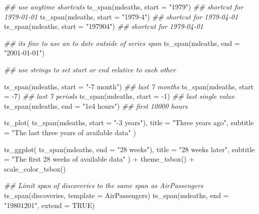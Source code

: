 \documentclass[
  letterpaper,
  DIV=11,
  numbers=noendperiod]{scrreport}
\newenvironment{Shaded}{\begin{snugshade}}{\end{snugshade}}
\newcommand{\AttributeTok}[1]{\textcolor[rgb]{0.40,0.45,0.13}{#1}}
\newcommand{\ConstantTok}[1]{\textcolor[rgb]{0.56,0.35,0.01}{#1}}
\newcommand{\DecValTok}[1]{\textcolor[rgb]{0.68,0.00,0.00}{#1}}
\newcommand{\DocumentationTok}[1]{\textcolor[rgb]{0.37,0.37,0.37}{\textit{#1}}}
\newcommand{\FunctionTok}[1]{\textcolor[rgb]{0.28,0.35,0.67}{#1}}
\newcommand{\NormalTok}[1]{\textcolor[rgb]{0.00,0.23,0.31}{#1}}
\newcommand{\SpecialCharTok}[1]{\textcolor[rgb]{0.37,0.37,0.37}{#1}}
\newcommand{\StringTok}[1]{\textcolor[rgb]{0.13,0.47,0.30}{#1}}
\begin{document}
\begin{Shaded}
\begin{Highlighting}[]
\DocumentationTok{\#\# use \textquotesingle{}anytime\textquotesingle{} shortcuts}
\FunctionTok{ts\_span}\NormalTok{(mdeaths, }\AttributeTok{start =} \StringTok{"1979"}\NormalTok{)       }\DocumentationTok{\#\# shortcut for 1979{-}01{-}01}
\FunctionTok{ts\_span}\NormalTok{(mdeaths, }\AttributeTok{start =} \StringTok{"1979{-}4"}\NormalTok{)     }\DocumentationTok{\#\# shortcut for 1979{-}04{-}01}
\FunctionTok{ts\_span}\NormalTok{(mdeaths, }\AttributeTok{start =} \StringTok{"197904"}\NormalTok{)     }\DocumentationTok{\#\# shortcut for 1979{-}04{-}01}

\DocumentationTok{\#\# it\textquotesingle{}s fine to use an to date outside of series span}
\FunctionTok{ts\_span}\NormalTok{(mdeaths, }\AttributeTok{end =} \StringTok{"2001{-}01{-}01"}\NormalTok{)}

\DocumentationTok{\#\# use strings to set start or end relative to each other}

\FunctionTok{ts\_span}\NormalTok{(mdeaths, }\AttributeTok{start =} \StringTok{"{-}7 month"}\NormalTok{)   }\DocumentationTok{\#\# last 7 months}
\FunctionTok{ts\_span}\NormalTok{(mdeaths, }\AttributeTok{start =} \SpecialCharTok{{-}}\DecValTok{7}\NormalTok{)           }\DocumentationTok{\#\# last 7 periods}
\FunctionTok{ts\_span}\NormalTok{(mdeaths, }\AttributeTok{start =} \SpecialCharTok{{-}}\DecValTok{1}\NormalTok{)           }\DocumentationTok{\#\# last single value}
\FunctionTok{ts\_span}\NormalTok{(mdeaths, }\AttributeTok{end =} \StringTok{"1e4 hours"}\NormalTok{)    }\DocumentationTok{\#\# first 10000 hours}


\FunctionTok{ts\_plot}\NormalTok{(}
  \FunctionTok{ts\_span}\NormalTok{(mdeaths, }\AttributeTok{start =} \StringTok{"{-}3 years"}\NormalTok{),}
  \AttributeTok{title =} \StringTok{"Three years ago"}\NormalTok{,}
  \AttributeTok{subtitle =} \StringTok{"The last three years of available data"}
\NormalTok{)}

\FunctionTok{ts\_ggplot}\NormalTok{(}
  \FunctionTok{ts\_span}\NormalTok{(mdeaths, }\AttributeTok{end =} \StringTok{"28 weeks"}\NormalTok{),}
  \AttributeTok{title =} \StringTok{"28 weeks later"}\NormalTok{,}
  \AttributeTok{subtitle =} \StringTok{"The first 28 weeks of available data"}
\NormalTok{) }\SpecialCharTok{+} \FunctionTok{theme\_tsbox}\NormalTok{() }\SpecialCharTok{+} \FunctionTok{scale\_color\_tsbox}\NormalTok{()}


\DocumentationTok{\#\# Limit span of \textquotesingle{}discoveries\textquotesingle{} to the same span as \textquotesingle{}AirPassengers\textquotesingle{}}
\FunctionTok{ts\_span}\NormalTok{(discoveries, }\AttributeTok{template =}\NormalTok{ AirPassengers)}
\FunctionTok{ts\_span}\NormalTok{(mdeaths, }\AttributeTok{end =} \StringTok{"19801201"}\NormalTok{, }\AttributeTok{extend =} \ConstantTok{TRUE}\NormalTok{)}
\end{Highlighting}
\end{Shaded}
\end{document}
